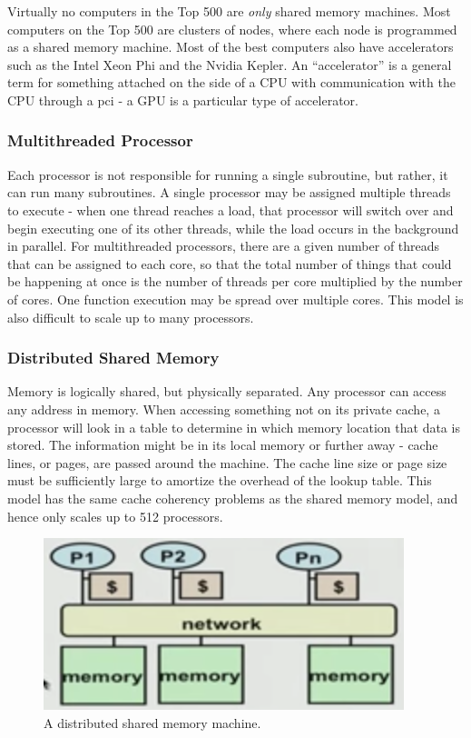 \documentclass[10pt]{article}
\begin{document}
\begin{flushleft}
Virtually no computers in the Top 500 are \textit{only} shared memory machines. Most computers on the Top 500 are clusters of nodes, where each node is programmed as a shared memory machine. Most of the best computers also have accelerators such as the Intel Xeon Phi and the Nvidia Kepler. An ``accelerator'' is a general term for something attached on the side of a CPU with communication with the CPU through a \gls{pci} - a GPU is a particular type of accelerator.

\subsubsection{Multithreaded Processor}

Each processor is not responsible for running a single subroutine, but rather, it can run many subroutines. A single processor may be assigned multiple threads to execute - when one thread reaches a load, that processor will switch over and begin executing one of its other threads, while the load occurs in the background in parallel. For multithreaded processors, there are a given number of threads that can be assigned to each core, so that the total number of things that could be happening at once is the number of threads per core multiplied by the number of cores. One function execution may be spread over multiple cores. This model is also difficult to scale up to many processors.

\subsubsection{Distributed Shared Memory}

Memory is logically shared, but physically separated. Any processor can access any address in memory. When accessing something not on its private cache, a processor will look in a table to determine in which memory location that data is stored. The information might be in its local memory or further away - cache lines, or pages, are passed around the machine. The cache line size or page size must be sufficiently large to amortize the overhead of the lookup table. This model has the same cache coherency problems as the shared memory model, and hence only scales up to 512 processors. 

\begin{figure}[H]
\centering
\includegraphics[width=0.5\linewidth]{figures/distributed-shared-memory.pdf}
\caption{A distributed shared memory machine.}
\end{figure}


\end{flushleft}
\end{document}
